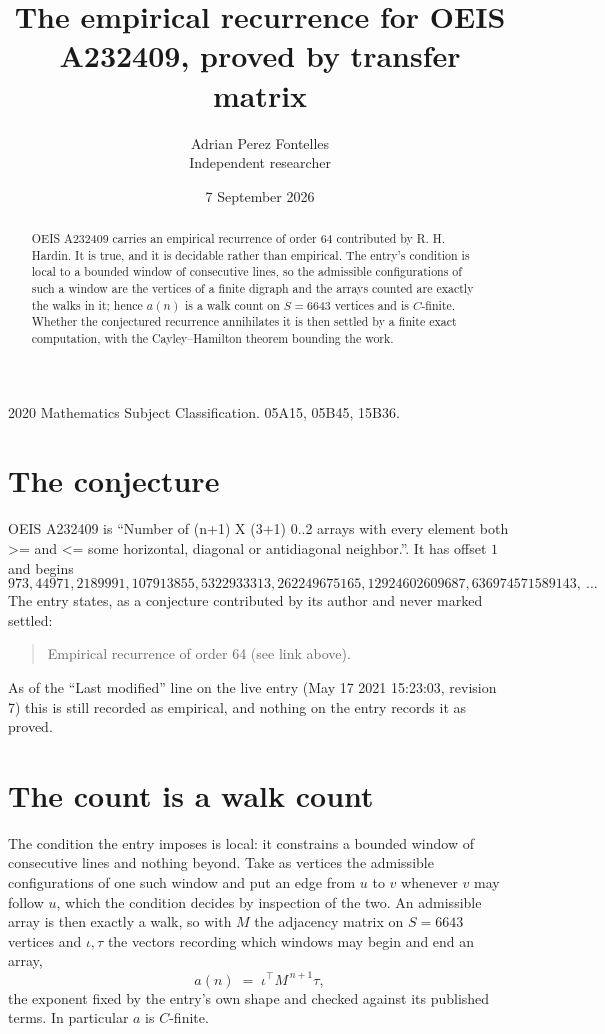 \documentclass[11pt,a4paper]{article}
\title{The empirical recurrence for OEIS A232409, proved by transfer matrix}
\author{Adrian Perez Fontelles\\ \small Independent researcher}
\date{7 September 2026}
\theoremstyle{plain}
\theoremstyle{definition}
\begin{document}
\maketitle

\begin{abstract}
OEIS A232409 carries an empirical recurrence of order $64$ contributed by R. H. Hardin. It is
true, and it is decidable rather than empirical. The entry's condition is local to a bounded window of consecutive lines, so
the admissible configurations of such a window are the vertices of a finite digraph and the
arrays counted are exactly the walks in it; hence $a(n)$ is a walk count on $S=6643$ vertices
and is $C$-finite. Whether the conjectured recurrence annihilates it is then settled by a
finite exact computation, with the Cayley--Hamilton theorem bounding the work.
\end{abstract}

\noindent\small 2020 Mathematics Subject Classification. 05A15, 05B45, 15B36.\normalsize

\section{The conjecture}

OEIS A232409 is ``Number of (n+1) X (3+1) 0..2 arrays with every element both >= and <= some horizontal, diagonal or antidiagonal neighbor.''. It has offset $1$ and begins
\[
973, 44971, 2189991, 107913855, 5322933313, 262249675165, 12924602609687, 636974571589143,\ \dots
\]
The entry states, as a conjecture contributed by its author and never marked settled:
\begin{quote}
Empirical recurrence of order 64 (see link above).
\end{quote}
As of the ``Last modified'' line on the live entry (May 17 2021 15:23:03, revision 7) this is still
recorded as empirical, and nothing on the entry records it as proved.

\section{The count is a walk count}

The condition the entry imposes is local: it constrains a bounded window of consecutive lines and nothing beyond. Take as
vertices the admissible configurations of one such window and put an edge from $u$ to $v$
whenever $v$ may follow $u$, which the condition decides by inspection of the two. An
admissible array is then exactly a walk, so with $M$ the adjacency matrix on $S=6643$ vertices
and $\iota,\tau$ the vectors recording which windows may begin and end an array,
\[
a(n)\;=\;\iota^{\!\top}M^{\,n+1}\tau ,
\]
the exponent fixed by the entry's own shape and checked against its published terms. In
particular $a$ is $C$-finite.
\end{document}
